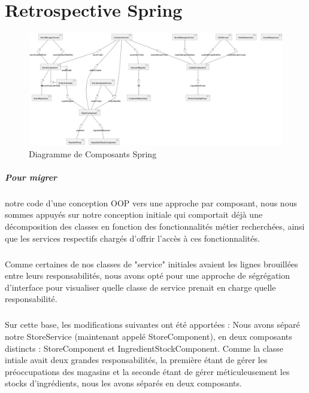 \chapter{Retrospective Spring}

\begin{figure}[!ht]
\includegraphics[width=1\textwidth]{component-diagram}
\centering
\caption{Diagramme de Composants Spring}
\label{uml:component}
\end{figure}
\paragraph{Pour migrer} notre code d'une conception OOP vers une approche par composant, nous nous sommes appuyés sur notre 
conception initiale qui comportait déjà une décomposition des classes en fonction des fonctionnalités métier recherchées,
ainsi que les services respectifs chargés d'offrir l'accès à ces fonctionnalités.

\paragraph{}Comme certaines de nos classes de "service" initiales avaient les lignes brouillées entre leurs responsabilités, nous avons opté pour une approche de ségrégation d'interface pour visualiser quelle classe de service prenait en charge quelle responsabilité.

\paragraph{}Sur cette base, les modifications suivantes ont été apportées :
Nous avons séparé notre StoreService (maintenant appelé StoreComponent), en deux composants distincts : StoreComponent et IngredientStockComponent. Comme la classe intiale avait deux grandes responsabilités, la première étant de gérer les préoccupations des magasins et la seconde étant de gérer méticuleusement les stocks d'ingrédients, nous les avons séparés en deux composants. 

